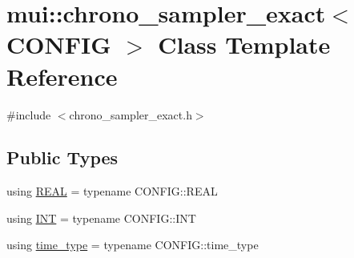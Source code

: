 \hypertarget{classmui_1_1chrono__sampler__exact}{}\section{mui\+:\+:chrono\+\_\+sampler\+\_\+exact$<$ C\+O\+N\+F\+IG $>$ Class Template Reference}
\label{classmui_1_1chrono__sampler__exact}


{\ttfamily \#include $<$chrono\+\_\+sampler\+\_\+exact.\+h$>$}

\subsection*{Public Types}
\begin{DoxyCompactItemize}
\item 
using \hyperlink{classmui_1_1chrono__sampler__exact_ad55f9693aa8d6a9652d9b51639463d84}{R\+E\+AL} = typename C\+O\+N\+F\+I\+G\+::\+R\+E\+AL
\item 
using \hyperlink{classmui_1_1chrono__sampler__exact_a1765b8d8fec705157ac526e186727e9a}{I\+NT} = typename C\+O\+N\+F\+I\+G\+::\+I\+NT
\item 
using \hyperlink{classmui_1_1chrono__sampler__exact_a5f9178b26822fe901f8a1e97ada68d95}{time\+\_\+type} = typename C\+O\+N\+F\+I\+G\+::time\+\_\+type
\end{DoxyCompactItemize}
